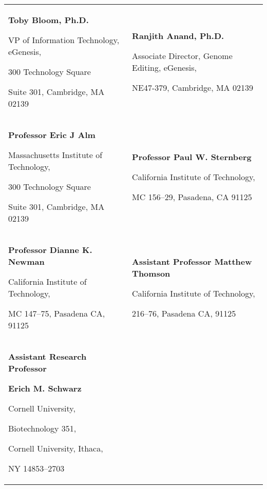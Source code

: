 \newpage
{}

\begin{tabularx}{\textwidth}{@{}X X@{}}
  \textbf{Toby Bloom, Ph.D.}\par
    VP of Information Technology, eGenesis,\par
    300 Technology Square\par
    Suite 301, Cambridge, MA 02139\par
    \makefield{\faEnvelopeO}{\url{tbloom@alum.mit.edu}}

  &

  \textbf{Ranjith Anand, Ph.D.}\par
    Associate Director, Genome Editing, eGenesis,\par
    NE47-379, Cambridge, MA 02139\par
    \makefield{\faEnvelopeO}{\url{rapanand@gmail.com}}\\

  \textbf{Professor Eric J Alm}\par
    Massachusetts Institute of Technology,\par
    300 Technology Square\par
    Suite 301, Cambridge, MA 02139\par
    \makefield{\faEnvelopeO}{\url{burnss@mit.edu}}

  &

  \textbf{Professor Paul W. Sternberg}\par
    California Institute of Technology,\par
    MC 156--29, Pasadena, CA 91125\par
    \makefield{\faEnvelopeO}{\url{pws@caltech.edu}}\\

  \textbf{Professor Dianne K. Newman}\par
    California Institute of Technology,\par
    MC 147--75, Pasadena CA, 91125\par
    \makefield{\faEnvelopeO}{\url{dkn@caltech.edu}}

  &

  \textbf{Assistant Professor Matthew Thomson}\par
    California Institute of Technology,\par
    216--76, Pasadena CA, 91125\par
    \makefield{\faEnvelopeO}{\url{mthomson@caltech.edu}}\\

  \textbf{Assistant Research Professor}\par
  \textbf{Erich M. Schwarz}\par
    Cornell University,\par
    Biotechnology 351,\par
    Cornell University, Ithaca,\par
    NY 14853--2703\par
    \makefield{\faEnvelopeO}{\url{ems394@cornell.edu}}
\end{tabularx}
